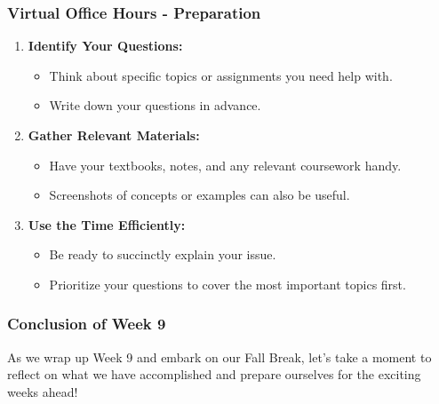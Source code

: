 \documentclass[aspectratio=169]{beamer}
\begin{document}
\begin{frame}[fragile]
    \frametitle{Virtual Office Hours - Preparation}
    \begin{enumerate}
        \item \textbf{Identify Your Questions:}
            \begin{itemize}
                \item Think about specific topics or assignments you need help with.
                \item Write down your questions in advance.
            \end{itemize}
        
        \item \textbf{Gather Relevant Materials:}
            \begin{itemize}
                \item Have your textbooks, notes, and any relevant coursework handy.
                \item Screenshots of concepts or examples can also be useful.
            \end{itemize}
        
        \item \textbf{Use the Time Efficiently:}
            \begin{itemize}
                \item Be ready to succinctly explain your issue.
                \item Prioritize your questions to cover the most important topics first.
            \end{itemize}
    \end{enumerate}
\end{frame}

\begin{frame}[fragile]
    \frametitle{Conclusion of Week 9}
    As we wrap up Week 9 and embark on our Fall Break, let’s take a moment to reflect on what we have accomplished and prepare ourselves for the exciting weeks ahead!
\end{frame}
\end{document}

